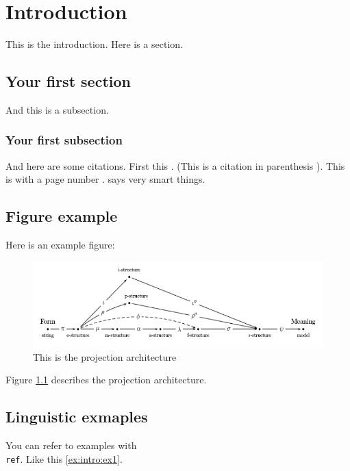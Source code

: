 

\chapter{Introduction}
\label{chapter1}

This is the introduction. Here is a section.

\section{Your first section}

And this is a subsection.

\subsection{Your first subsection}

And here are some citations. First this \cite{kalouli2022negation}. (This is a citation in parenthesis \citealt{kalouli2022negation}). This is with a page number \citep[p. 5]{kalouli2022negation}. \citet{kalouli2022negation} says very smart things.

\section{Figure example}

Here is an example figure:

\begin{figure}
    \centering
    \includegraphics[scale=0.5]{upload/tex/figures/parallelprojection.png}
    \caption{This is the projection architecture}
    \label{fig-label1}
\end{figure}

Figure \ref{fig-label1} describes the projection architecture. 

\section{Linguistic exmaples}

You can refer to examples with \texttt{\\ref}. Like this \ref{ex:intro:ex1}.

